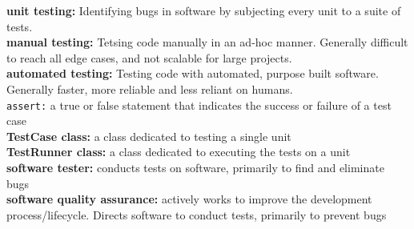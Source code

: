 \documentclass[a4paper,10pt]{article}
\begin{document}
\textcolor{RubineRed}{\textbf{unit testing:}} Identifying bugs in software by subjecting every unit to a suite of tests. \\ 
\textcolor{RubineRed}{\textbf{manual testing:}}  Tetsing code manually in an ad-hoc manner. Generally difficult to reach all edge cases, and not scalable for large projects. \\
\textcolor{RubineRed}{\textbf{automated testing:}} Testing code with automated, purpose built software. Generally faster, more reliable and less reliant on humans.\\  
\textcolor{RubineRed}{\texttt{assert:}} a true or false statement that indicates the success or failure of a test case \\  
\textcolor{RubineRed}{\textbf{TestCase class:}} a class dedicated to testing a single unit \\  
\textcolor{RubineRed}{\textbf{TestRunner class:}} a class dedicated to executing the tests on a unit \\  
\textcolor{RubineRed}{\textbf{software tester:}} conducts tests on software, primarily to find and eliminate bugs \\  
\textcolor{RubineRed}{\textbf{software quality assurance:}} actively works to improve the development process/lifecycle. Directs software to conduct tests, primarily to prevent bugs \\ 
\end{document}
